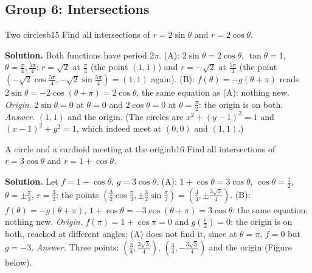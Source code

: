 \documentclass[11pt]{article}
\begin{document}
\subsection*{Group 6: Intersections}

\begin{exmp}{Two circles}{b15}
Find all intersections of $r=2\sin\theta$ and $r=2\cos\theta$.

\textbf{Solution.} Both functions have period $2\pi$. (A): $2\sin\theta=2\cos\theta$, $\tan\theta=1$, $\theta=\frac\pi4,\frac{5\pi}4$: $r=\sqrt2$ at $\frac\pi4$ (the point $(1,1)$) and $r=-\sqrt2$ at $\frac{5\pi}4$ (the point $\left(-\sqrt2\cos\frac{5\pi}4,-\sqrt2\sin\frac{5\pi}4\right)=(1,1)$ again). (B): $f(\theta)=-g(\theta+\pi)$ reads $2\sin\theta=-2\cos(\theta+\pi)=2\cos\theta$, the same equation as (A): nothing new. \emph{Origin.} $2\sin\theta=0$ at $\theta=0$ and $2\cos\theta=0$ at $\theta=\frac\pi2$: the origin is on both. \emph{Answer.} $(1,1)$ and the origin. (The circles are $x^2+(y-1)^2=1$ and $(x-1)^2+y^2=1$, which indeed meet at $(0,0)$ and $(1,1)$.)
\end{exmp}

\begin{exmp}{A circle and a cardioid meeting at the origin}{b16}
Find all intersections of $r=3\cos\theta$ and $r=1+\cos\theta$.

\textbf{Solution.} Let $f=1+\cos\theta$, $g=3\cos\theta$. (A): $1+\cos\theta=3\cos\theta$, $\cos\theta=\frac12$, $\theta=\pm\frac\pi3$, $r=\frac32$: the points $\left(\frac32\cos\frac\pi3,\pm\frac32\sin\frac\pi3\right)=\left(\frac34,\pm\frac{3\sqrt3}4\right)$. (B): $f(\theta)=-g(\theta+\pi)$, $1+\cos\theta=-3\cos(\theta+\pi)=3\cos\theta$: the same equation: nothing new. \emph{Origin.} $f(\pi)=1+\cos\pi=0$ and $g\left(\frac\pi2\right)=0$: the origin is on both, reached at different angles; (A) does not find it, since at $\theta=\pi$, $f=0$ but $g=-3$. \emph{Answer.} Three points: $\left(\frac34,\frac{3\sqrt3}4\right)$, $\left(\frac34,-\frac{3\sqrt3}4\right)$ and the origin (Figure below).
\end{exmp}
\end{document}
